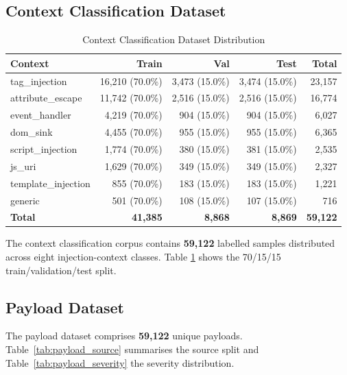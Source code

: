 \subsection{Context Classification Dataset} 
\begin{table}[H]
  \centering
   \small
  \begin{tabular}{lrrrr}
    \toprule
    \rowcolor{headblue}
    \textbf{Context} & \textbf{Train} & \textbf{Val} & \textbf{Test} & \textbf{Total} \\
    \midrule
    tag\_injection        & 16{,}210 (70.0\%) & 3{,}473 (15.0\%) & 3{,}474 (15.0\%) & 23{,}157 \\
    attribute\_escape     & 11{,}742 (70.0\%) & 2{,}516 (15.0\%) & 2{,}516 (15.0\%) & 16{,}774 \\
    event\_handler        &  4{,}219 (70.0\%) &    904 (15.0\%) &    904 (15.0\%) &  6{,}027 \\
    dom\_sink             &  4{,}455 (70.0\%) &    955 (15.0\%) &    955 (15.0\%) &  6{,}365 \\
    script\_injection     &  1{,}774 (70.0\%) &    380 (15.0\%) &    381 (15.0\%) &  2{,}535 \\
    js\_uri               &  1{,}629 (70.0\%) &    349 (15.0\%) &    349 (15.0\%) &  2{,}327 \\
    template\_injection   &    855 (70.0\%) &    183 (15.0\%) &    183 (15.0\%) &  1{,}221 \\
    generic               &    501 (70.0\%) &    108 (15.0\%) & 107 (15.0\%) &    716 \\
    \midrule
    \textbf{Total} & \textbf{41{,}385} & \textbf{8{,}868} & \textbf{8{,}869} & \textbf{59{,}122} \\
    \bottomrule
  \end{tabular}
 \caption{Context Classification Dataset Distribution}
  \label{tab:context_dist}
\end{table}
The context classification corpus contains \textbf{59,122} labelled samples distributed across eight injection-context classes. Table \ref{tab:context_dist} shows the 70/15/15 train/validation/test split.
 

 
\subsection{Payload Dataset}

 
The payload dataset comprises \textbf{59,122} unique payloads. Table~\ref{tab:payload_source} summarises the source split and Table~\ref{tab:payload_severity} the severity distribution.
 

